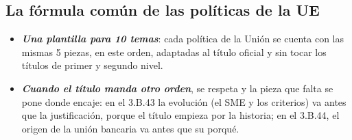 \documentclass[11pt]{article}
\begin{document}
\subsection{La fórmula común de las políticas de la UE}\label{sec:ue}

\begin{itemize}
\item \textbf{\emph{Una plantilla para 10 temas}}: cada política de la Unión se cuenta con las mismas 5 piezas, en este orden, adaptadas al título oficial y sin tocar los títulos de primer y segundo nivel.
\item \textbf{\emph{Cuando el título manda otro orden}}, se respeta y la pieza que falta se pone donde encaje: en el 3.B.43 la evolución (el SME y los criterios) va antes que la justificación, porque el título empieza por la historia; en el 3.B.44, el origen de la unión bancaria va antes que su porqué.
\end{itemize}
\end{document}
